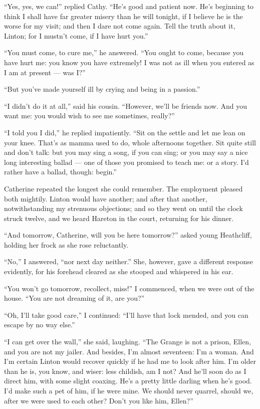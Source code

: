 \par “Yes, yes, we can!” replied Cathy. “He's good and patient now. He's beginning to think I shall have far greater misery than he will tonight, if I believe he is the worse for my visit; and then I dare not come again. Tell the truth about it, Linton; for I mustn't come, if I have hurt you.”
\par “You must come, to cure me,” he answered. “You ought to come, because you have hurt me: you know you have extremely! I was not as ill when you entered as I am at present — was I?”
\par “But you've made yourself ill by crying and being in a passion.”
\par “I didn't do it at all,” said his cousin. “However, we'll be friends now. And you want me: you would wish to see me sometimes, really?”
\par “I told you I did,” he replied impatiently. “Sit on the settle and let me lean on your knee. That's as mamma used to do, whole afternoons together. Sit quite still and don't talk: but you may sing a song, if you can sing; or you may say a nice long interesting ballad — one of those you promised to teach me: or a story. I'd rather have a ballad, though: begin.”
\par Catherine repeated the longest she could remember. The employment pleased both mightily. Linton would have another; and after that another, notwithstanding my strenuous objections; and so they went on until the clock struck twelve, and we heard Hareton in the court, returning for his dinner.
\par “And tomorrow, Catherine, will you be here tomorrow?” asked young Heathcliff, holding her frock as she rose reluctantly.
\par “No,” I answered, “nor next day neither.” She, however, gave a different response evidently, for his forehead cleared as she stooped and whispered in his ear.
\par “You won't go tomorrow, recollect, miss!” I commenced, when we were out of the house. “You are not dreaming of it, are you?”
\par “Oh, I'll take good care,” I continued: “I'll have that lock mended, and you can escape by no way else.”
\par “I can get over the wall,” she said, laughing. “The Grange is not a prison, Ellen, and you are not my jailer. And besides, I'm almost seventeen: I'm a woman. And I'm certain Linton would recover quickly if he had me to look after him. I'm older than he is, you know, and wiser: less childish, am I not? And he'll soon do as I direct him, with some slight coaxing. He's a pretty little darling when he's good. I'd make such a pet of him, if he were mine. We should never quarrel, should we, after we were used to each other? Don't you like him, Ellen?”
